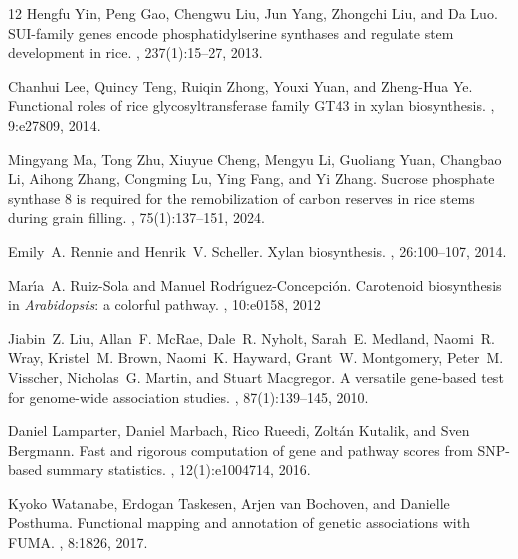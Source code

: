 \documentclass[unnumsec,webpdf,contemporary,large]{oup-authoring-template}%
\theoremstyle{thmstyleone}%
\theoremstyle{thmstyletwo}%
\theoremstyle{thmstylethree}%
\begin{document}
\begin{thebibliography}{12}
Hengfu Yin, Peng Gao, Chengwu Liu, Jun Yang, Zhongchi Liu, and Da Luo.
\newblock SUI-family genes encode phosphatidylserine synthases and regulate stem development in rice.
, 237(1):15--27, 2013.

Chanhui Lee, Quincy Teng, Ruiqin Zhong, Youxi Yuan, and Zheng-Hua Ye.
\newblock Functional roles of rice glycosyltransferase family GT43 in xylan biosynthesis.
, 9:e27809, 2014.

Mingyang Ma, Tong Zhu, Xiuyue Cheng, Mengyu Li, Guoliang Yuan, Changbao Li, Aihong Zhang, Congming Lu, Ying Fang, and Yi Zhang.
\newblock Sucrose phosphate synthase 8 is required for the remobilization of carbon reserves in rice stems during grain filling.
, 75(1):137--151, 2024.

Emily~A. Rennie and Henrik~V. Scheller.
\newblock Xylan biosynthesis.
, 26:100--107, 2014.

Mar{\'\i}a~A. Ruiz-Sola and Manuel Rodr{\'\i}guez-Concepci{\'o}n.
\newblock Carotenoid biosynthesis in \textit{Arabidopsis}: a colorful pathway.
, 10:e0158, 2012

Jiabin~Z. Liu, Allan~F. McRae, Dale~R. Nyholt, Sarah~E. Medland, Naomi~R. Wray, Kristel~M. Brown, Naomi~K. Hayward, Grant~W. Montgomery, Peter~M. Visscher, Nicholas~G. Martin, and Stuart Macgregor.
\newblock A versatile gene-based test for genome-wide association studies.
, 87(1):139--145, 2010.

Daniel Lamparter, Daniel Marbach, Rico Rueedi, Zolt{\'a}n Kutalik, and Sven Bergmann.
\newblock Fast and rigorous computation of gene and pathway scores from SNP-based summary statistics.
, 12(1):e1004714, 2016.

Kyoko Watanabe, Erdogan Taskesen, Arjen van Bochoven, and Danielle Posthuma.
\newblock Functional mapping and annotation of genetic associations with FUMA.
, 8:1826, 2017.



\end{thebibliography}
\end{document}
